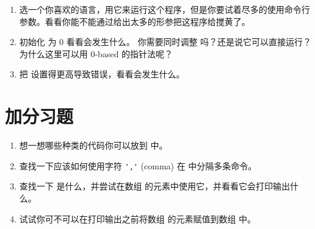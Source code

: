 \begin{enumerate}
\item 选一个你喜欢的语言，用它来运行这个程序，但是你要试着尽多的使用命令行参数。看看你能不能通过给出太多的形参把这程序给搅黄了。
\item 初始化  为 0 看看会发生什么。 你需要同时调整  吗？还是说它可以直接运行？为什么这里可以用 0-based 的指针法呢？
\item 把  设置得更高导致错误，看看会发生什么。
\end{enumerate}

\section{加分习题}

\begin{enumerate}
\item 想一想哪些种类的代码你可以放到  中。
\item 查找一下应该如何使用字符 \verb|','| (comma) 在  中分隔多条命令。
\item 查找一下  是什么，并尝试在数组  的元素中使用它，并看看它会打印输出什么。 
\item 试试你可不可以在打印输出之前将数组  的元素赋值到数组  中。
\end{enumerate}


